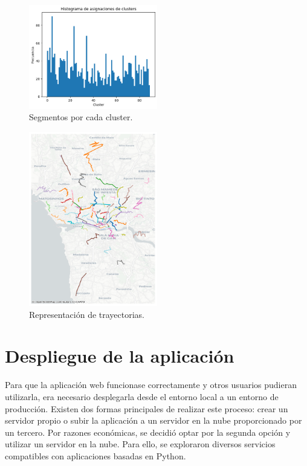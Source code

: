 \begin{enumerate}
\begin{figure}[h!]
    \centering
    \includegraphics[width=0.5\textwidth]{img/histograma_Spect.png}
    \caption{Segmentos por cada cluster.}
    \label{fig:histograma_Spectral}
\end{figure}

\begin{figure}[h!]
    \centering
    \includegraphics[width=0.5\textwidth]{img/r_tray_Spect.png}
    \caption{Representación de trayectorias.}
    \label{fig:trayectorias_Spectral}
\end{figure}

\FloatBarrier

\end{enumerate}


\section{Despliegue de la aplicación}

Para que la aplicación web funcionase correctamente y otros usuarios pudieran utilizarla, era necesario desplegarla desde el entorno local a un entorno de producción. Existen dos formas principales de realizar este proceso: crear un servidor propio o subir la aplicación a un servidor en la nube proporcionado por un tercero. Por razones económicas, se decidió optar por la segunda opción y utilizar un servidor en la nube. Para ello, se exploraron diversos servicios compatibles con aplicaciones basadas en Python.

